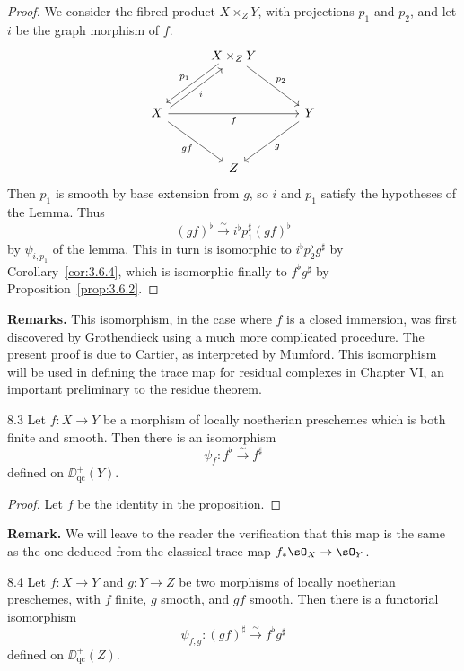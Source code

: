 \begin{proof}
We consider the fibred product $X\times_Z Y$, with projections $p_1$ and $p_2$, and let $i$ be the graph morphism of $f$.
\[
\begin{tikzcd}[row sep=3em, column sep=3em]
	& X \times_Z Y \arrow[dl, "p_1"', shift right] \arrow[dr, "p_2"] & \\
	X \arrow[ur, "i"', shift right] \arrow[rr, "f"'] \arrow[dr, "gf"'] & & Y \arrow[dl, "g"] \\
	& Z &
\end{tikzcd}
\]
Then $p_1$ is smooth by base extension from $g$, so $i$ and $p_1$ satisfy the hypotheses of the Lemma. Thus
\[
(gf)^{\flat} \xrightarrow{\sim} i^{\flat} p_1^{\sharp} (gf)^{\flat}
\]
by $\psi_{i,p_1}$ of the lemma. This in turn is isomorphic to $i^{\flat} p_2^{\flat} g^{\sharp}$ by Corollary~\ref{cor:3.6.4}, which is isomorphic finally to $f^{\flat}g^{\sharp}$ by Proposition~\ref{prop:3.6.2}.
\end{proof}

\textbf{Remarks.}
This isomorphism, in the case where $f$ is a closed immersion, was first discovered by Grothendieck using a much more complicated procedure. The present proof is due to Cartier, as interpreted by Mumford. This isomorphism will be used in defining the trace map for residual complexes in Chapter VI, an important preliminary to the residue theorem.

\begin{bookcorollary}{8.3}\label{cor:3.8.3}
Let $f\colon X\to Y$ be a morphism of locally noetherian preschemes which is both finite and smooth. Then there is an isomorphism
\[
\psi_f \colon f^{\flat} \xrightarrow{\sim} f^{\sharp}
\]
defined on $\DD_{\mathrm{qc}}^+(Y)$.
\end{bookcorollary}

\begin{proof}
Let $f$ be the identity in the proposition.
\end{proof}

\textbf{Remark.}
We will leave to the reader the verification that this map is the same as the one deduced from the classical trace map $f_*\sO_X\to\sO_Y$.

\begin{bookproposition}{8.4}\label{prop:3.8.4}
Let $f\colon X\to Y$ and $g\colon Y\to Z$ be two morphisms of locally noetherian preschemes, with $f$ finite, $g$ smooth, and $gf$ smooth. Then there is a functorial isomorphism
\[
\psi_{f,g}\colon (gf)^{\sharp} \xrightarrow{\sim} f^{\flat}g^{\sharp}
\]
defined on $\DD_{\mathrm{qc}}^+(Z)$.
\end{bookproposition}


